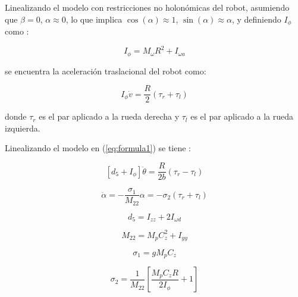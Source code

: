 \documentclass[11pt, twoside]{book}     %
\begin{document}
            Linealizando el modelo con restricciones no holonómicas del robot, asumiendo que $ \beta = 0 $, $ \alpha \approx 0 $, lo que implica $ \cos(\alpha) \approx 1 $, $ \sin(\alpha) \approx \alpha $, y definiendo $ I_{\phi} $ como \citep{VMHGuzmancontrol2013}:

            \begin{equation}
                I_{\phi}=M_\omega R^{2}+ I_{\omega a}
            \end{equation}		

            \noindent se encuentra la aceleración traslacional del robot como:

            \begin{equation}
                \boxed{ I_\phi \dot{v}= \frac{R}{2}(\tau_r+\tau_l) }
                \label{eq:formula22}
            \end{equation}

            \noindent donde $\tau_r$ es el par aplicado a la rueda derecha y $\tau_l$ es el par aplicado a la rueda izquierda.
            
            Linealizando el modelo en (\ref{eq:formula1}) se tiene \citep{VMHGuzmancontrol2013}:

            \begin{equation}
                \boxed{[d_5+I_\phi]\ddot{\theta}=\frac{R}{2b}(\tau_r-\tau_l)}
                \label{eq:formula23}
            \end{equation}

            \begin{equation}
                \boxed{\ddot{\alpha}=-\frac{\sigma_1}{M_{22}}\alpha=-\sigma_2(\tau_r+\tau_l)}
                \label{eq:formula24}
            \end{equation}

            \begin{equation}
                d_5=I_{zz}+2I_{\omega d}
            \end{equation}

            \begin{equation}
                M_{22}=M_pC_z^{2}+I_{yy	}
            \end{equation}

            \begin{equation}
                \sigma_1= gM_pC_z
            \end{equation}

            \begin{equation}
                \sigma_2=\frac{1}{M_{22}}\left[ \frac{M_pC_zR}{2I_\phi} + 1 \right]
                \label{eq:formula28}            
            \end{equation}
\end{document}
